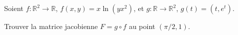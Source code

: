 \begin{exercice}\label{exoGeomAnal-0037}

Soient $f:\mathbb{R}^2\to \mathbb{R}$, $f(x,y)=x\ln(yx^2)$, et $g:\mathbb{R}\to \mathbb{R}^2$, $g(t)=(t, e^t)$. 

Trouver la matrice jacobienne $F=g\circ f$ au point $(\pi/2, 1)$.


\end{exercice}
